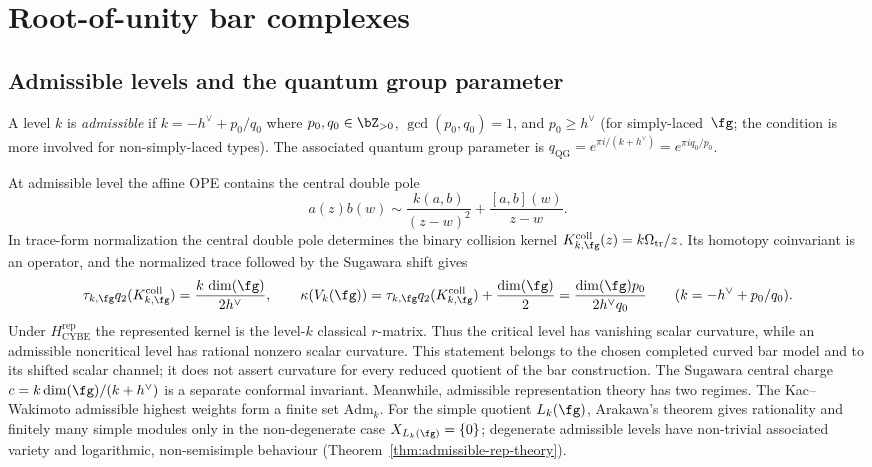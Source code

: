 \section{Root-of-unity bar complexes}
\label{sec:root-of-unity}

\subsection{Admissible levels and the quantum group parameter}

\begin{definition}
\label{def:admissible-level-dl}
A level $k$ is \emph{admissible} if
$k = -h^\vee + p_0/q_0$ where $p_0, q_0 \in \bZ_{> 0}$,
$\gcd(p_0, q_0) = 1$, and $p_0 \geq h^\vee$ (for
simply-laced~$\fg$; the condition is more involved for
non-simply-laced types). The associated quantum group parameter is
$q_{\mathrm{QG}} = e^{\pi i/(k + h^\vee)} = e^{\pi i q_0/p_0}$.
\end{definition}

At admissible level the affine OPE contains the central double pole
\[
 a(z)b(w)\sim \frac{k(a,b)}{(z-w)^2}+\frac{[a,b](w)}{z-w}.
\]
In trace-form normalization the central double pole determines the
binary collision kernel
$K_{k,\fg}^{\mathrm{coll}}(z)=k\Omega_{\mathrm{tr}}/z$.  Its homotopy
coinvariant is an operator, and the normalized trace followed by the
Sugawara shift gives
\[
 \tau_{k,\fg}q_2(K_{k,\fg}^{\mathrm{coll}})
 =\frac{k\,\dim(\fg)}{2h^\vee},
 \qquad
 \kappa(V_k(\fg))
 =\tau_{k,\fg}q_2(K_{k,\fg}^{\mathrm{coll}})+\frac{\dim(\fg)}2
 = \frac{\dim(\fg)p_0}{2h^\vee q_0}
 \qquad
 (k=-h^\vee+p_0/q_0).
\]
Under $H_{\mathrm{CYBE}}^{\mathrm{rep}}$ the represented kernel is
the level-$k$ classical $r$-matrix.
Thus the critical level has vanishing scalar curvature, while an
admissible noncritical level has rational nonzero scalar curvature.
This statement belongs to the chosen completed curved bar model and
to its shifted scalar channel; it does not assert curvature for every
reduced quotient of the bar construction. The Sugawara central charge
$c = k\dim(\fg)/(k+h^\vee)$ is a separate conformal invariant.
Meanwhile, admissible representation theory has two regimes. The
Kac--Wakimoto admissible highest weights form a finite set
$\mathrm{Adm}_k$. For the simple quotient $L_k(\fg)$, Arakawa's
theorem gives rationality and finitely many simple modules only in the
non-degenerate case $X_{L_k(\fg)}=\{0\}$; degenerate admissible levels
have non-trivial associated variety and logarithmic, non-semisimple
behaviour (Theorem~\ref{thm:admissible-rep-theory}).

